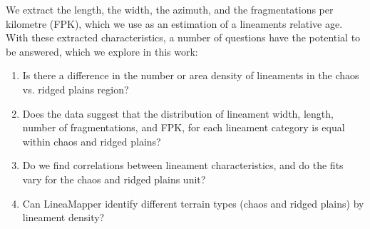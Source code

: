 We extract the length, the width, the azimuth, and the fragmentations per kilometre (FPK), which we use as an estimation of a lineaments relative age. With these extracted characteristics, a number of questions have the potential to be answered, which we explore in this work: 

\begin{enumerate}
    \item Is there a difference in the number or area density of lineaments in the chaos vs. ridged plains region?
    \item Does the data suggest that the distribution of lineament width, length, number of fragmentations, and FPK, for each lineament category is equal within chaos and ridged plains?
    \item Do we find correlations between lineament characteristics, and do the fits vary for the chaos and ridged plains unit?
    \item Can LineaMapper identify different terrain types (chaos and ridged plains) by lineament density?
\end{enumerate}

